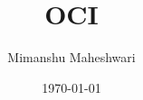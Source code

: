 \documentclass{report}
\title{\textbf{OCI}}
\author{Mimanshu Maheshwari}
\date{\today}
\begin{document}
\maketitle
\tableofcontents
\listoffigures
\lstlistoflistings





\printglossaries
\end{document}

